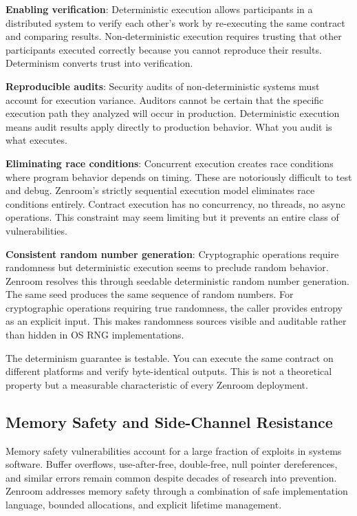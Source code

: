 \textbf{Enabling verification}: Deterministic execution allows
participants in a distributed system to verify each other's work by
re-executing the same contract and comparing
results. Non-deterministic execution requires trusting that other
participants executed correctly because you cannot reproduce their
results. Determinism converts trust into verification.

\textbf{Reproducible audits}: Security audits of non-deterministic
systems must account for execution variance. Auditors cannot be
certain that the specific execution path they analyzed will occur in
production. Deterministic execution means audit results apply directly
to production behavior. What you audit is what executes.

\textbf{Eliminating race conditions}: Concurrent execution creates
race conditions where program behavior depends on timing. These are
notoriously difficult to test and debug. Zenroom's strictly sequential
execution model eliminates race conditions entirely. Contract
execution has no concurrency, no threads, no async operations. This
constraint may seem limiting but it prevents an entire class of
vulnerabilities.

\textbf{Consistent random number generation}: Cryptographic operations
require randomness but deterministic execution seems to preclude
random behavior. Zenroom resolves this through seedable deterministic
random number generation. The same seed produces the same sequence of
random numbers. For cryptographic operations requiring true
randomness, the caller provides entropy as an explicit input. This
makes randomness sources visible and auditable rather than hidden in
OS RNG implementations.

The determinism guarantee is testable. You can execute the same
contract on different platforms and verify byte-identical
outputs. This is not a theoretical property but a measurable
characteristic of every Zenroom deployment.

\subsection{Memory Safety and Side-Channel Resistance}

Memory safety vulnerabilities account for a large fraction of exploits
in systems software. Buffer overflows, use-after-free, double-free,
null pointer dereferences, and similar errors remain common despite
decades of research into prevention. Zenroom addresses memory safety
through a combination of safe implementation language, bounded
allocations, and explicit lifetime management.

